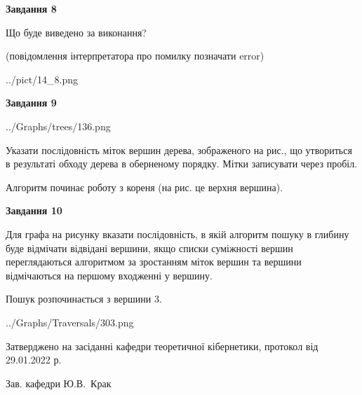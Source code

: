 \documentclass[12pt, ukrainian]{article}
\begin{document}
{\begin {large}
{\begin {center}\textbf{Завдання 8}\end {center}}\par
Що буде виведено за виконання?\par
 (повідомлення інтерпретатора про помилку позначати error)\par
\begin{center}
	{../pict/14_8.png}
\end{center}
\newpage

{\begin {center}\textbf{Завдання 9}\end {center}}\par

\begin{center}
	{../Graphs/trees/136.png}
\end{center}
Указати послідовність міток вершин дерева, зображеного на рис., що утвориться в результаті обходу дерева в оберненому порядку. Мітки записувати через пробіл.\par Алгоритм починає роботу з кореня (на рис. це верхня вершина).\par
\newpage

{\begin {center}\textbf{Завдання 10}\end {center}}\par
Для графа на рисунку вказати послідовність, в якій алгоритм пошуку в глибину буде відмічати відвідані вершини, якщо списки суміжності вершин переглядаються алгоритмом за зростанням міток вершин та вершини відмічаються на першому вход\-женні у вершину.\par
Пошук розпочинається з вершини 3.\par

\begin{center}
	{../Graphs/Traversals/303.png}
\end{center}\par
\newpage


\end {large}
}
{\smallskip \begin {small} Затверджено на засіданні кафедри теоретичної кібернетики, протокол  від   29.01.2022 р.\par\smallskip\smallskip
{\parbox {6.5 cm}{Зав. кафедри \dotfill Ю.В.~Крак}} \end{small}}
\end{document}
